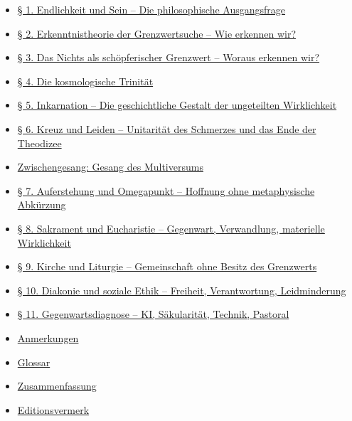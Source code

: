 \documentclass[
  ngerman,
]{article}
\providecommand{\tightlist}{%
  \setlength{\itemsep}{0pt}\setlength{\parskip}{0pt}}
\begin{document}
\begin{itemize}
\tightlist
\item
  \hyperref[-1-endlichkeit-und-sein-die-philosophische-ausgangsfrage]{§
  1. Endlichkeit und Sein -- Die philosophische Ausgangsfrage}
\item
  \hyperref[-2-erkenntnistheorie-der-grenzwertsuche-wie-erkennen-wir]{§
  2. Erkenntnistheorie der Grenzwertsuche -- Wie erkennen wir?}
\item
  \hyperref[-3-das-nichts-als-schuxf6pferischer-grenzwert-woraus-erkennen-wir]{§
  3. Das Nichts als schöpferischer Grenzwert -- Woraus erkennen wir?}
\item
  \hyperref[-4-die-kosmologische-trinituxe4t]{§ 4. Die kosmologische
  Trinität}
\item
  \hyperref[-5-inkarnation-die-geschichtliche-gestalt-der-ungeteilten-wirklichkeit]{§
  5. Inkarnation -- Die geschichtliche Gestalt der ungeteilten
  Wirklichkeit}
\item
  \hyperref[-6-kreuz-und-leiden-unitarituxe4t-des-schmerzes-und-das-ende-der-theodizee]{§
  6. Kreuz und Leiden -- Unitarität des Schmerzes und das Ende der
  Theodizee}
\item
  \hyperref[zwischengesang-gesang-des-multiversums]{Zwischengesang:
  Gesang des Multiversums}
\item
  \hyperref[-7-auferstehung-und-omegapunkt-hoffnung-ohne-metaphysische-abkuxfcrzung]{§
  7. Auferstehung und Omegapunkt -- Hoffnung ohne metaphysische
  Abkürzung}
\item
  \hyperref[-8-sakrament-und-eucharistie-gegenwart-verwandlung-materielle-wirklichkeit]{§
  8. Sakrament und Eucharistie -- Gegenwart, Verwandlung, materielle
  Wirklichkeit}
\item
  \hyperref[-9-kirche-und-liturgie-gemeinschaft-ohne-besitz-des-grenzwerts]{§
  9. Kirche und Liturgie -- Gemeinschaft ohne Besitz des Grenzwerts}
\item
  \hyperref[-10-diakonie-und-soziale-ethik-freiheit-verantwortung-leidminderung]{§
  10. Diakonie und soziale Ethik -- Freiheit, Verantwortung,
  Leidminderung}
\item
  \hyperref[-11-gegenwartsdiagnose-ki-suxe4kularituxe4t-technik-pastoral]{§
  11. Gegenwartsdiagnose -- KI, Säkularität, Technik, Pastoral}
\item
  \hyperref[anmerkungen]{Anmerkungen}
\item
  \hyperref[glossar]{Glossar}
\item
  \hyperref[zusammenfassung]{Zusammenfassung}
\item
  \hyperref[editionsvermerk]{Editionsvermerk}
\end{itemize}
\end{document}
